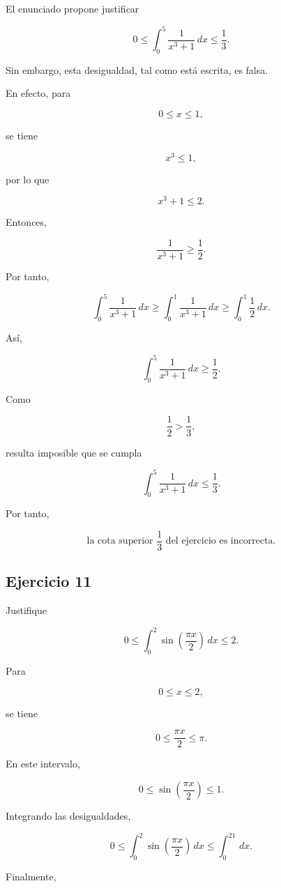 \documentclass[12pt]{article}
\begin{document}
El enunciado propone justificar

\[
0
\leq
\int_0^5\frac{1}{x^3+1}\,dx
\leq
\frac13.
\]

Sin embargo, esta desigualdad, tal como está escrita, es falsa.

En efecto, para

\[
0\leq x\leq1,
\]

se tiene

\[
x^3\leq1,
\]

por lo que

\[
x^3+1\leq2.
\]

Entonces,

\[
\frac1{x^3+1}\geq\frac12.
\]

Por tanto,

\[
\int_0^5\frac1{x^3+1}\,dx
\geq
\int_0^1\frac1{x^3+1}\,dx
\geq
\int_0^1\frac12\,dx.
\]

Así,

\[
\int_0^5\frac1{x^3+1}\,dx
\geq
\frac12.
\]

Como

\[
\frac12>\frac13,
\]

resulta imposible que se cumpla

\[
\int_0^5\frac1{x^3+1}\,dx
\leq
\frac13.
\]

Por tanto,

\[
\boxed{
\text{la cota superior } \frac13
\text{ del ejercicio es incorrecta}
}.
\]

\subsection*{Ejercicio 11}

Justifique

\[
0
\leq
\int_0^2
\sin\left(\frac{\pi x}{2}\right)\,dx
\leq
2.
\]

Para

\[
0\leq x\leq2,
\]

se tiene

\[
0
\leq
\frac{\pi x}{2}
\leq
\pi.
\]

En este intervalo,

\[
0\leq\sin\left(\frac{\pi x}{2}\right)\leq1.
\]

Integrando las desigualdades,

\[
0
\leq
\int_0^2
\sin\left(\frac{\pi x}{2}\right)\,dx
\leq
\int_0^21\,dx.
\]

Finalmente,
\end{document}
